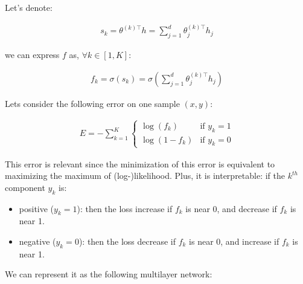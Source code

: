 Let's denote:

\begin{align}
	s_k  = \theta^{(k)\top} h = \sum_{j=1}^{d} \theta^{(k)\top}_j h_j 
\end{align}

we can express $f$ as, $\forall k \in [1, K]$:

\begin{align}
	f_k  = \sigma(s_k) = \sigma( \sum_{j=1}^{d} \theta^{(k)\top}_j h_j) 
\end{align}

Lets consider the following error on one sample $(x, y)$:

\begin{align}
	E = - \sum_{k=1}^K
  			  	\left\{
				    \begin{array}{ll}
				        \log (f_k) & \mbox{if } y_k =1 \\
				        \log (1 - f_k) & \mbox{if } y_k =0
				    \end{array}
				\right.
\end{align}

This error is relevant since the minimization of this error is equivalent to maximizing the maximum of (log-)likelihood.
Plus, it is interpretable: if the $k^{th}$ component $y_k$ is:
\begin{itemize}
	\item positive ($y_k=1$): then the loss increase if $f_k$ is near 0, and decrease if $f_k$ is near 1.
	\item negative ($y_k=0$): then the loss decrease if $f_k$ is near 0, and increase if $f_k$ is near 1.
\end{itemize}



We can represent it as the following multilayer network:

